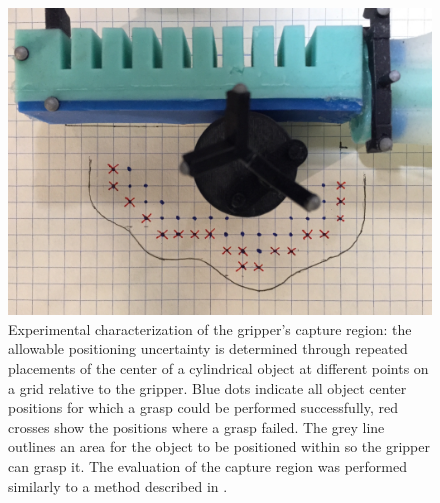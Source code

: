 
\begin{figure}[htb]
\centering
   \includegraphics[width=0.8\columnwidth]{Figures/experimental_results/uncertainty}
   \caption{Experimental characterization of the gripper's capture region: the allowable positioning uncertainty is determined through repeated placements of the center of a cylindrical object at different points on a grid relative to the gripper. Blue dots indicate all object center positions for which a grasp could be performed successfully, red crosses show the positions where a grasp failed. The grey line outlines an area for the object to be positioned within so the gripper can grasp it. The evaluation of the capture region was performed similarly to a method described in \cite{dogar2010push}.}
   \label{fig:grasp_uncertainty}
\end{figure} 

